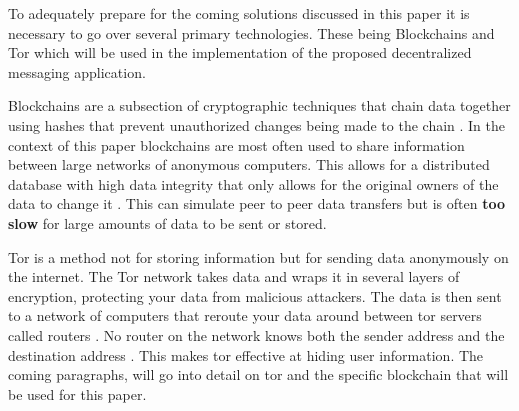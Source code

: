 \documentclass[../main/main.tex]{subfiles}
\begin{document}
To adequately prepare for the coming solutions discussed in this paper it is necessary to go over several primary technologies. 
These being Blockchains and Tor which will be used in the implementation of the proposed decentralized messaging application. 

Blockchains are a subsection of cryptographic techniques that chain data together using hashes that prevent unauthorized changes being made to the chain \cite{ETH}. 
In the context of this paper blockchains are most often used to share information between large networks of anonymous computers. 
This allows for a distributed database with high data integrity that only allows for the original owners of the data to change it \cite{ETH}. 
This can simulate peer to peer data transfers but is often \textbf{too slow} for large amounts of data to be sent or stored.

Tor is a method not for storing information but for sending data anonymously on the internet. 
The Tor network takes data and wraps it in several layers of encryption, protecting your data from malicious attackers. %
The data is then sent to a network of computers that reroute your data around between tor servers called routers \cite{TOR}. 
No router on the network knows both the sender address and the destination address \cite{TOR}. 
This makes tor effective at hiding user information. 
The coming paragraphs, will go into detail on tor and the specific blockchain that will be used for this paper.
\end{document}
